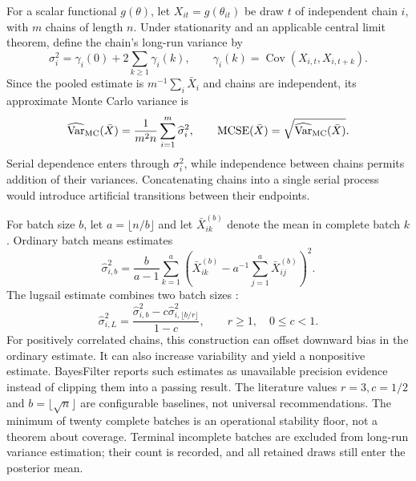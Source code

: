 For a scalar functional $g(\theta)$, let $X_{it}=g(\theta_{it})$ be draw $t$
of independent chain $i$, with $m$ chains of length $n$. Under stationarity and
an applicable central limit theorem, define the chain's long-run variance by
\begin{equation}
 \sigma_i^2=\gamma_i(0)+2\sum_{k\ge1}\gamma_i(k),\qquad
 \gamma_i(k)=\operatorname{Cov}(X_{i,t},X_{i,t+k}).
\end{equation}
Since the pooled estimate is $m^{-1}\sum_i\bar X_i$ and chains are independent,
its approximate Monte Carlo variance is
\begin{equation}
 \widehat{\operatorname{Var}}_{\rm MC}(\bar X)
   =\frac{1}{m^2 n}\sum_{i=1}^m\widehat\sigma_i^2,
 \qquad \operatorname{MCSE}(\bar X)
   =\sqrt{\widehat{\operatorname{Var}}_{\rm MC}(\bar X)}.
 \label{eq:bf-pooled-mean-mcse}
\end{equation}
Serial dependence enters through $\sigma_i^2$, while independence between
chains permits addition of their variances. Concatenating chains into a single
serial process would introduce artificial transitions between their endpoints.

For batch size $b$, let $a=\lfloor n/b\rfloor$ and let $\bar X_{ik}^{(b)}$
denote the mean in complete batch $k$. Ordinary batch means estimates
\begin{equation}
 \widehat\sigma_{i,b}^2=
 \frac{b}{a-1}\sum_{k=1}^{a}
   \left(\bar X_{ik}^{(b)}-a^{-1}\sum_{j=1}^{a}\bar X_{ij}^{(b)}\right)^2.
\end{equation}
The lugsail estimate combines two batch sizes
\citep[section 4, equation (7)]{vats2021lugsail}:
\begin{equation}
 \widehat\sigma_{i,L}^2=
 \frac{\widehat\sigma_{i,b}^2-c\widehat\sigma_{i,\lfloor b/r\rfloor}^2}{1-c},
 \qquad r\ge1,\quad 0\le c<1.
 \label{eq:bf-lugsail-mcse}
\end{equation}
For positively correlated chains, this construction can offset downward bias
in the ordinary estimate. It can also increase variability and yield a
nonpositive estimate. BayesFilter reports such estimates as unavailable
precision evidence instead of clipping them into a passing result. The
literature values $r=3,c=1/2$ and $b=\lfloor\sqrt n\rfloor$ are configurable
baselines, not universal recommendations. The minimum of twenty complete
batches is an operational stability floor, not a theorem about coverage.
Terminal incomplete batches are excluded from long-run variance estimation;
their count is recorded, and all retained draws still enter the posterior mean.

